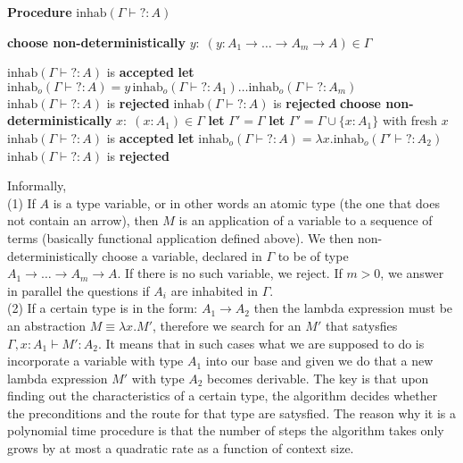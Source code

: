 \documentclass[12pt, titlepage, a4paper]{amsart}
\theoremstyle{definition}
\theoremstyle{theorem}
\theoremstyle{remark}
\begin{document}
\textbf{Procedure } $\mathrm{inhab}(\Gamma\vdash ?:A)$
\begin{algorithmic}
        \State \textbf{choose non-deterministically} $y:\; (y:A_1\to\dots\to A_m\to A)\in \Gamma$    	
    	
    		\State $\mathrm{inhab}(\Gamma\vdash ?:A)$ is  \textbf{accepted}
    		\State \textbf{ let} $\mathrm{inhab}_o(\Gamma\vdash ?:A)=y\,\mathrm{inhab}_o(\Gamma\vdash ?:A_1)\dots \mathrm{inhab}_o(\Gamma\vdash ?:A_m)$ 
    		\Else \quad$\mathrm{inhab}(\Gamma\vdash ?:A)$ is \textbf{ rejected}
    		\EndIf
    	\Else \quad$\mathrm{inhab}(\Gamma\vdash ?:A)$ is \textbf{ rejected}
    	\EndIf
		\State \textbf{choose non-deterministically} $x:\;(x:A_1)\in \Gamma$        
        	\State \textbf{let} $\Gamma'=\Gamma$
        	\Else \textbf{ let} $\Gamma'=\Gamma\cup\{x:A_1\}$ with fresh $x$
    	\EndIf
    	\State $\mathrm{inhab}(\Gamma\vdash ?:A)$ is \textbf{accepted}
    	\State \textbf{ let }$\mathrm{inhab}_o(\Gamma\vdash ?:A)=\lambda x.\mathrm{inhab}_o(\Gamma'\vdash ?:A_2)$
    	\State $\mathrm{inhab}(\Gamma\vdash ?:A)$ is \textbf{ rejected }
    	\EndIf
    \EndIf
\end{algorithmic}
Informally,\\
(1) If $A$ is a type variable, or in other words an atomic type (the one that does not contain an arrow), then $M$ is an application of a variable to a sequence of terms (basically functional application defined above). We then non-deterministically choose a variable, declared in $\Gamma$ to be of type $A_1\rightarrow \dots\rightarrow A_m \rightarrow A$. If there is no such variable, we reject. If $m > 0$, we answer in parallel the questions if $A_i$ are inhabited in $\Gamma$.\\
(2) If a certain type is in the form: $A_1 \rightarrow A_2$ then the lambda expression must be an abstraction $M \equiv\lambda x.M'$, therefore we search for an $M'$ that satysfies $\Gamma, x:A_1 \vdash M':A_2$. It means that in such cases what we are supposed to do is incorporate a variable with type $A_1$ into our base and given we do that a new lambda expression $M'$ with type $A_2$ becomes derivable. The key is that upon finding out the characteristics of a certain type, the algorithm decides whether the preconditions and the route for that type are satysfied. The reason why it is a polynomial time procedure is that the number of steps the algorithm takes only grows by at most a quadratic rate as a function of context size.\\\\
\end{document}
